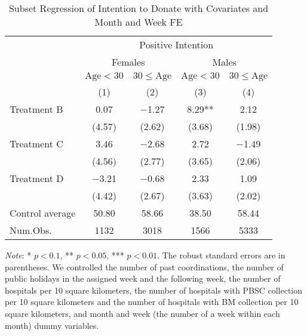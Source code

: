 \documentclass[12pt, a4paper]{article}
\begin{document}
\begin{table}[H]

\caption{\label{tab:int-lm-subset2}Subset Regression of Intention to Donate with Covariates and Month and Week FE}
\centering
\fontsize{8}{10}\selectfont
\begin{threeparttable}
\begin{tabular}[t]{lcccc}
\toprule
\multicolumn{1}{c}{ } & \multicolumn{4}{c}{Positive Intention} \\
\cmidrule(l{3pt}r{3pt}){2-5}
\multicolumn{1}{c}{ } & \multicolumn{2}{c}{Females} & \multicolumn{2}{c}{Males} \\
\cmidrule(l{3pt}r{3pt}){2-3} \cmidrule(l{3pt}r{3pt}){4-5}
\multicolumn{1}{c}{ } & \multicolumn{1}{c}{$\text{Age} < 30$} & \multicolumn{1}{c}{$30 \le \text{Age}$} & \multicolumn{1}{c}{$\text{Age} < 30$} & \multicolumn{1}{c}{$30 \le \text{Age}$} \\
\cmidrule(l{3pt}r{3pt}){2-2} \cmidrule(l{3pt}r{3pt}){3-3} \cmidrule(l{3pt}r{3pt}){4-4} \cmidrule(l{3pt}r{3pt}){5-5}
  & (1) & (2) & (3) & (4)\\
\midrule
Treatment B & \num{0.07} & \num{-1.27} & \num{8.29}** & \num{2.12}\\
 & (\num{4.57}) & (\num{2.62}) & (\num{3.68}) & (\num{1.98})\\
Treatment C & \num{3.46} & \num{-2.68} & \num{2.72} & \num{-1.49}\\
 & (\num{4.56}) & (\num{2.77}) & (\num{3.65}) & (\num{2.06})\\
Treatment D & \num{-3.21} & \num{-0.68} & \num{2.33} & \num{1.09}\\
 & (\num{4.42}) & (\num{2.67}) & (\num{3.63}) & (\num{2.02})\\
\midrule
Control average & 50.80 & 58.66 & 38.50 & 58.44\\
Num.Obs. & \num{1132} & \num{3018} & \num{1566} & \num{5333}\\
\bottomrule
\end{tabular}
\begin{tablenotes}
\item \emph{Note}: * $p < 0.1$, ** $p < 0.05$, *** $p < 0.01$. The robust standard errors are in parentheses. We controlled the number of past coordinations, the number of public holidays in the assigned week and the following week, the number of hospitals per 10 square kilometers, the number of hospitals with PBSC collection per 10 square kilometers and the number of hospitals with BM collection per 10 square kilometers, and month and week (the number of a week within each month) dummy variables.
\end{tablenotes}
\end{threeparttable}
\end{table}
\end{document}
